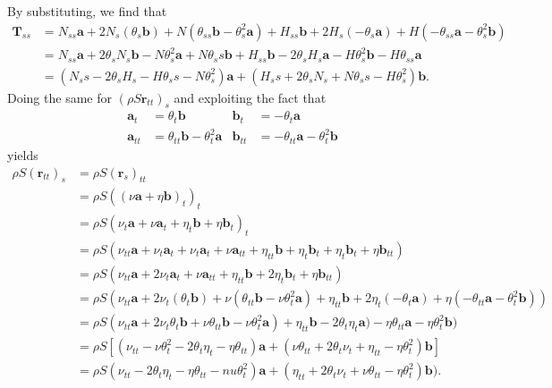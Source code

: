 By substituting, we find that
\begin{equation}
\begin{split}
\mathbf{T}_{ss}& = N_{ss}\mathbf{a} + 2N_s(\theta_s\mathbf{b}) + N(\theta_{ss}\mathbf{b}-\theta_s^2\mathbf{a}) + H_{ss}\mathbf{b} + 2H_s(-\theta_s\mathbf{a}) + H(-\theta_{ss}\mathbf{a}-\theta_s^2\mathbf{b})\\
               & = N_{ss}\mathbf{a} + 2\theta_sN_s\mathbf{b}- N\theta_s^2\mathbf{a} + N\theta_ss\mathbf{b} + H_{ss}\mathbf{b} -2\theta_sH_s\mathbf{a}-H\theta_s^2\mathbf{b}-H\theta_{ss}\mathbf{a}\\
               & = (N_ss -2\theta_sH_s - H\theta_ss-N\theta_s^2)\mathbf{a} + (H_ss+2\theta_sN_s + N\theta_ss -H\theta_s^2)\mathbf{b}.
\end{split}
\end{equation}
Doing the same for $(\rho S\mathbf{r}_{tt})_s$ and exploiting the fact that 
\begin{align}
\mathbf{a}_t    &=\theta_t\mathbf{b} & \mathbf{b}_t &= -\theta_t\mathbf{a}\\
\mathbf{a}_{tt} &=\theta_{tt}\mathbf{b}-\theta_t^2\mathbf{a} & \mathbf{b}_{tt} &= -\theta_{tt}\mathbf{a}-\theta_t^2\mathbf{b} 
\end{align}
yields
\begin{equation}
\begin{split}
\rho S(\mathbf{r}_{tt})_s &= \rho S (\mathbf{r}_s)_{tt}\\
                          &= \rho S ((\nu\mathbf{a} + \eta\mathbf{b})_t)_t\\
                          &= \rho S (\nu_t\mathbf{a} + \nu\mathbf{a}_t + \eta_t\mathbf{b} + \eta\mathbf{b}_t)_t\\
                          &= \rho S (\nu_{tt}\mathbf{a} + \nu_t\mathbf{a}_t + \nu_t\mathbf{a}_t + \nu\mathbf{a}_{tt} + \eta_{tt}\mathbf{b} + \eta_t\mathbf{b}_t + \eta_t\mathbf{b}_t + \eta\mathbf{b}_{tt})\\
                          &= \rho S (\nu_{tt}\mathbf{a} + 2\nu_t\mathbf{a}_t + \nu\mathbf{a}_{tt} + \eta_{tt}\mathbf{b} + 2\eta_t\mathbf{b}_t + \eta\mathbf{b}_{tt})\\
                          &= \rho S (\nu_{tt}\mathbf{a} + 2\nu_t(\theta_t\mathbf{b}) + \nu(\theta_{tt}\mathbf{b}-\nu\theta_t^2\mathbf{a}) + \eta_{tt}\mathbf{b} + 2\eta_t(-\theta_t\mathbf{a}) + \eta(-\theta_{tt}\mathbf{a}-\theta_t^2\mathbf{b}))\\
                          &= \rho S (\nu_{tt}\mathbf{a} + 2\nu_t\theta_t\mathbf{b} + \nu\theta_{tt}\mathbf{b}-\nu\theta_t^2\mathbf{a}) + \eta_{tt}\mathbf{b} - 2\theta_t\eta_t\mathbf{a}) - \eta\theta_{tt}\mathbf{a} - \eta\theta_t^2\mathbf{b})\\
                          &= \rho S \left[ (\nu_{tt}-\nu\theta_t^2 - 2\theta_t\eta_t -\eta\theta_{tt})\mathbf{a} + (\nu\theta_{tt} + 2\theta_t\nu_t + \eta_{tt} - \eta\theta_t^2)\mathbf{b} \right]\\
                          &= \rho S (\nu_{tt} - 2\theta_t\eta_t -\eta\theta_{tt} - nu\theta_t^2  )\mathbf{a}+ (\eta_{tt}+ 2\theta_t\nu_t + \nu\theta_{tt} - \eta\theta_t^2)\mathbf{b}).
\end{split}
\end{equation}
